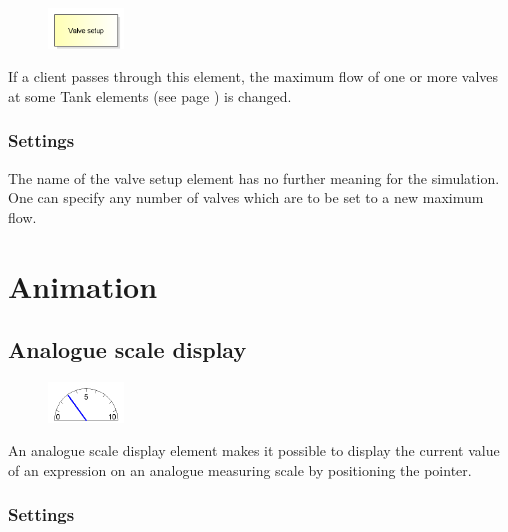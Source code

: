 \begin{figure}
\vspace{-22pt}
\includegraphics[width=2cm]{imageModelElementTankValveSetup.png}
\vspace{-22pt}
\end{figure}

If a client passes through this element, the maximum flow of one or more valves
at some Tank elements (see page \pageref{ref:ModelElementTank}) is changed.

\subsection*{Settings}

The name of the valve setup element has no further meaning for the simulation.
One can specify any number of valves which are to be set to a new maximum flow.





\chapter{Animation}

\section{Analogue scale display}
\label{ref:ModelElementAnimationPointerMeasuring}

\begin{figure}
\vspace{-22pt}
\includegraphics[width=2cm]{imageModelElementAnimationPointerMeasuring.png}
\vspace{-22pt}
\end{figure}

An analogue scale display element makes it possible to display the current
value of an expression on an analogue measuring scale by positioning the pointer.

\subsection*{Settings}

